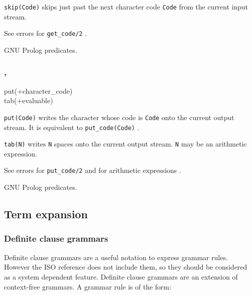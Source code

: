 \texttt{skip(Code)} skips just past the next character code \texttt{Code}
from the current input stream.

\Errors

See errors for \texttt{get\_code/2} .

\Portability

GNU Prolog predicates.

\subsubsection{,
               }

\begin{TemplatesOneCol}
put(+character\_code)\\
tab(+evaluable)

\end{TemplatesOneCol}

\Description

\texttt{put(Code)} writes the character whose code is \texttt{Code} onto the
current output stream. It is equivalent to \texttt{put\_code(Code)}
.

\texttt{tab(N)} writes \texttt{N} spaces onto the current output
stream. \texttt{N} may be an arithmetic expression.

\Errors

See errors for \texttt{put\_code/2}  and for arithmetic
expressions .

\Portability

GNU Prolog predicates.

\subsection{Term expansion}
\label{Term-expansion}

\subsubsection{Definite clause grammars}
\label{DCG}

Definite clause grammars are a useful notation to express grammar rules.
However the ISO reference does not include them, so they should be considered
as a system dependent feature. Definite clause grammars are an extension of
context-free grammars. A grammar rule is of the form:


